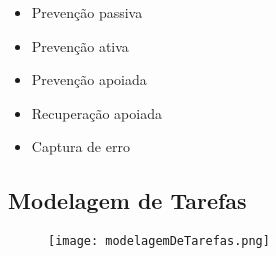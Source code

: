 \begin{itemize}
\item Prevenção passiva
\item Prevenção ativa
\item Prevenção apoiada
\item Recuperação apoiada
\item Captura de erro
\end{itemize}


\subsection{Modelagem de Tarefas}

\begin{figure}[!h]
    \centering
    \texttt{[image: modelagemDeTarefas.png]}
    \caption{}
    \label{fig:modelagemDeTarefas}
\end{figure} 


